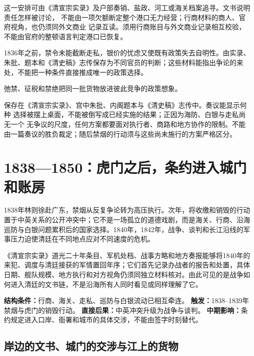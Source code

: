 这一安排可由《清宣宗实录》及户部奏销、盐政、河工或海关档案追寻。文书说明责任怎样被讨论，
不能由一项欠额断定整个港口无力经营；行商材料的商人、官府视角，也仍须同外文商业
记录互读。须用行商账目与外文商业记录相互校验，不能由官府的整顿语言判定港口已恢复。

1836年之前，禁令未能截断走私，银价的忧虑又使既有政策失去自明性。由实录、朱批、题本和《清史稿》志传保存为不同官员的判断；这些材料能指出争论的来处，不能把一种条件直接推成唯一的政策选择。

弛禁、征税和禁绝把同一批货物放进彼此竞争的政策想象。

保存在《清宣宗实录》、宫中朱批、内阁题本与《清史稿》志传中。奏议能显示何种
选择被摆上桌面，不能被倒写成已经实施的结果；正因为海防、白银与走私尚无一个
无争议的尺度，任何方案都要面对执行者、商路和地方协作的限制。不能由一篇奏议的胜负裁定；随后禁烟的行动须与这些尚未施行的方案严格区分。

\section{1838—1850：虎门之后，条约进入城门和账房}

1838年林则徐赴广东，禁烟从反复争论转为高压执行。次年，将收缴和销毁的行动置于中英关系的公开冲突中；它不是一场孤立的道德戏剧，而是海关、行商、沿海巡防与白银问题累积后的国家选择。1840年，1842年，战争、谈判和长江沿线的军事压力迫使清廷在不同地点应对不同速度的危机。

《清宣宗实录》道光二十年条目、军机处档、战事方略和地方奏报能够将1840年的来犯、调度与清廷接获的军情置回年序；它们首先记录办战者的报告和处置，具体日期、舰队规模、地方执行和对方视角仍须同独立材料核对。由此可见的是战争如何进入清廷的文书链，不是沿海所有人同时看见或同样理解了它。

\begin{causalchain}
\textbf{结构条件：}行商、海关、走私、巡防与白银流动已相互牵连。\quad
\textbf{触发：}1838--1839年禁烟与虎门的销毁行动。\quad
\textbf{直接后果：}中英冲突升级为战争与谈判。\quad
\textbf{中期影响：}条约规定进入口岸、衙署和城市的具体交涉，不能由签字时刻替代。
\end{causalchain}

\subsection{岸边的文书、城门的交涉与江上的货物}

